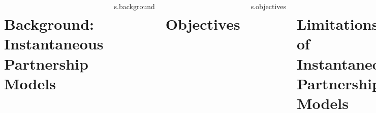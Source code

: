 \documentclass[]{poster}
\begin{document}
  \maketitle
  \begin{columns}
    \section{Background: Instantaneous Partnership Models}{s.background}
    \section{Objectives}{s.objectives}
    \section{Limitations of Instantaneous Partnership Models}{s.instant}
    \section{Methods: Objective 1 -- Proposed Model}{s.proposed}
    \section{Methods: Objective 2 -- Simulation Study}{s.experiment}
    \section{Results: Objective 2 -- Simulation Study}{s.results}
    \section{Implications}{s.implications}
    \section{References + Acknowledgments}{s.refs}
  \end{columns}
\end{document}
